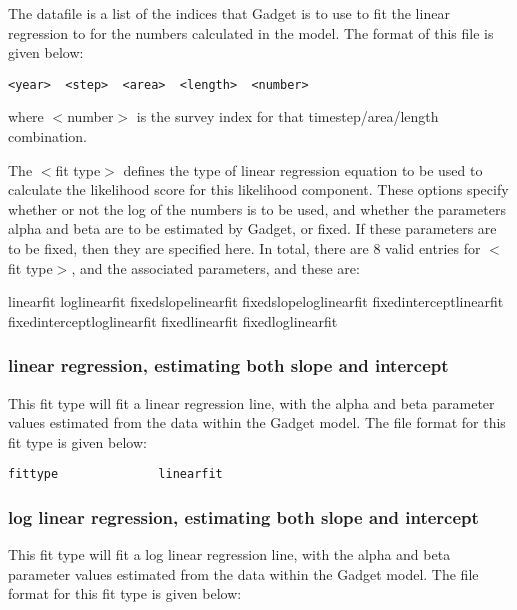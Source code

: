 \documentclass[10pt,twoside]{book}
\begin{document}
The datafile is a list of the indices that Gadget is to use to fit the linear regression to for the numbers calculated in the model.  The format of this file is given below:

{\small\begin{verbatim}
<year>  <step>  <area>  <length>  <number>
\end{verbatim}}

where $<$number$>$ is the survey index for that timestep/area/length combination.

\bigskip
The $<$fit type$>$ defines the type of linear regression equation to be used to calculate the likelihood score for this likelihood component.  These options specify whether or not the log of the numbers is to be used, and whether the parameters alpha and beta are to be estimated by Gadget, or fixed.  If these parameters are to be fixed, then they are specified here.  In total, there are 8 valid entries for $<$fit type$>$, and the associated parameters, and these are:

\bigskip
linearfit\newline
loglinearfit\newline
fixedslopelinearfit\newline
fixedslopeloglinearfit\newline
fixedinterceptlinearfit\newline
fixedinterceptloglinearfit\newline
fixedlinearfit\newline
fixedloglinearfit

\subsubsection{linear regression, estimating both slope and intercept}
This fit type will fit a linear regression line, with the alpha and beta parameter values estimated from the data within the Gadget model.  The file format for this fit type is given below:
{\small\begin{verbatim}
fittype              linearfit
\end{verbatim}}

\subsubsection{log linear regression, estimating both slope and intercept}
This fit type will fit a log linear regression line, with the alpha and beta parameter values estimated from the data within the Gadget model.  The file format for this fit type is given below:
\end{document}
